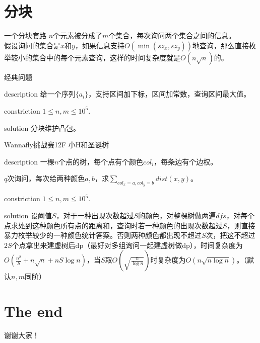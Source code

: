 \documentclass{beamer}
\begin{document}
	\section{分块}
	\begin{frame}{一个分块套路}
		$n$个元素被分成了$m$个集合，每次询问两个集合之间的信息。\\
		
		假设询问的集合是$x$和$y$，如果信息支持$O(\min(sz_x,sz_y))$地查询，那么直接枚举较小的集合中的每个元素查询，这样的时间复杂度就是$O(n\sqrt n)$的。
		
	\end{frame}
	\begin{frame}{经典问题}
		\begin{block}{description}
			给一个序列$\{a_i\}$，支持区间加下标，区间加常数，查询区间最大值。
		\end{block}
		\begin{block}{constriction}
			$1 \le n, m \le 10^5.$
		\end{block}
		\pause
		\begin{block}{solution}
			分块维护凸包。
		\end{block}
	\end{frame}
	\begin{frame}{Wannafly挑战赛12F 小H和圣诞树}
		\begin{block}{description}
			一棵$n$个点的树，每个点有个颜色$col_i$，每条边有个边权。
			
			$q$次询问，每次给两种颜色$a,b$，求$\sum_{col_x=a,col_y=b}dist(x,y)$。
		\end{block}
		\begin{block}{constriction}
			$1 \le n, m \le 10^5.$
		\end{block}
		\pause
		\begin{block}{solution}
			设阈值$S$，对于一种出现次数超过$S$的颜色，对整棵树做两遍$dfs$，对每个点求处到这种颜色所有点的距离和，查询时若一种颜色的出现次数超过$S$，则直接暴力枚举较少的一种颜色统计答案。否则两种颜色都出现不超过$S$次，把这不超过$2S$个点拿出来建虚树后dp（最好对多组询问一起建虚树做dp），时间复杂度为$O(\frac{n^2}{S}+n\sqrt n+nS\log n)$，当$S$取$O(\sqrt{\frac{n}{\log n}})$时复杂度为$O(n\sqrt{n\log n})$。（默认$n,m$同阶）
		\end{block}
	\end{frame}
	\section{The end}
	\begin{frame}{}
		\begin{center}
			{\Huge 谢谢大家！}
		\end{center}
	\end{frame}
\end{document}
